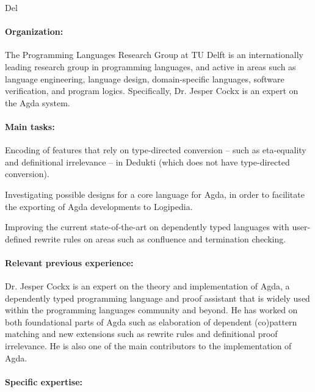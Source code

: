 \begin{sitedescription}{Del}

\paragraph{Organization:}
The Programming Languages Research Group at TU Delft is an
internationally leading research group in programming languages, and
active in areas such as language engineering, language design,
domain-specific languages, software verification, and program logics.
Specifically, Dr. Jesper Cockx is an expert on the Agda system.

\paragraph{Main tasks:}

\begin{compactitem}
\item Encoding of features that rely on type-directed conversion --
  such as eta-equality and definitional irrelevance -- in Dedukti
  (which does not have type-directed conversion).
\item Investigating possible designs for a core language for Agda, in
  order to facilitate the exporting of Agda developments to Logipedia.
\item Improving the current state-of-the-art on dependently typed
  languages with user-defined rewrite rules on areas such as
  confluence and termination checking.
\end{compactitem}


\paragraph{Relevant previous experience:}

Dr. Jesper Cockx is an expert on the theory and implementation of
Agda, a dependently typed programming language and proof assistant
that is widely used within the programming languages community and
beyond. He has worked on both foundational parts of Agda such as
elaboration of dependent (co)pattern matching and new extensions such
as rewrite rules and definitional proof irrelevance. He is also one of
the main contributors to the implementation of Agda.
  
\paragraph{Specific expertise:}


\end{sitedescription}
